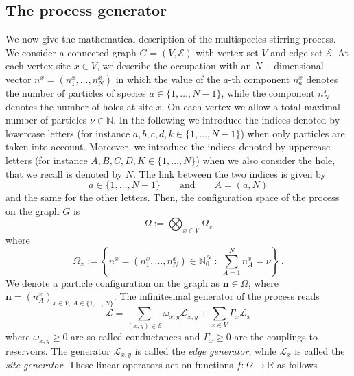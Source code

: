 \documentclass[10pt]{article}
\numberwithin{equation}{section}
\numberwithin{equation}{subsection}
\newcommand{\twoj}{\nu}
\begin{document}
\subsection{The process generator}\label{subsectionGeneratorStr}
We now give the mathematical description of the multispecies stirring process.
We consider a connected graph $G=(V,\mathcal{E})$ with vertex set $V$ and edge set $\mathcal{E}$.
At each vertex site $x\in V$, we describe the occupation with an $N-$dimensional vector $n^{x}=(n_{1}^{x},\ldots,n_{N}^{x})$ in which the value of the $a$-th component $n_{a}^{x}$ {\color{blue} denotes the number of particles of species $a\in \{1,\ldots,N-1\}$, while the component $n_{N}^{x}$ denotes the number of holes at site $x$.} On each vertex we {\color{blue} allow a total maximal number of particles $\nu\in \mathbb{N}$}. {\color{blue} In the following we introduce the indices denoted by lowercase letters (for instance $a,b,c,d,k\in \{1,\ldots,N-1\}$) when only particles are taken into account. Moreover, we introduce the indices denoted by uppercase letters (for instance $A,B,C,D,K\in\{1,\ldots,N\}$)  when we also consider the hole, that we recall is denoted by $N$. The link between the two indices is given by 
\begin{equation}
	a\in \{1,\ldots,N-1\}\qquad \text{and}\qquad A=(a,N)
	\end{equation} 
and the same for the other letters.} Then, the configuration space of the process on the graph $G$ is 
\begin{equation}\label{stateSpace}
    \Omega:=\bigotimes_{x\in V} \Omega_{x}
\end{equation}
where
\begin{equation}
\Omega_{x}:=\left\{n^x=(n_{1}^{x},\ldots,n_{N}^{x})\in\mathbb{N}_0^{N}\;:\; \sum_{A=1}^{N}n_{A}^{x}=\twoj\right\}\,.
\end{equation}
We denote a particle configuration on the graph as $\bm{n}\in \Omega$, where $\bm{n}=(n_{A}^{x})_{x\in V,\,A\in\{1,\ldots,N\}}$.
The infinitesimal generator of the process reads
\begin{equation}\label{Generator}
    \mathcal{L}=\sum_{(x,y)\in \mathcal{E}}\omega_{x,y}\mathcal{L}_{x,y}+\sum_{x\in V}\Gamma_{x}\mathcal{L}_{x}
\end{equation}
where  $ \omega_{x,y}\geq 0$ are so-called conductances and $\Gamma_{x}\geq 0$ are the couplings to reservoirs. 
The generator $\mathcal{L}_{x,y}$ is called the \textit{edge generator}, while $\mathcal{L}_{x}$ is called the \textit{site generator}. These linear operators act on functions $f:\Omega\to \mathbb{R}$ as follows
\end{document}
